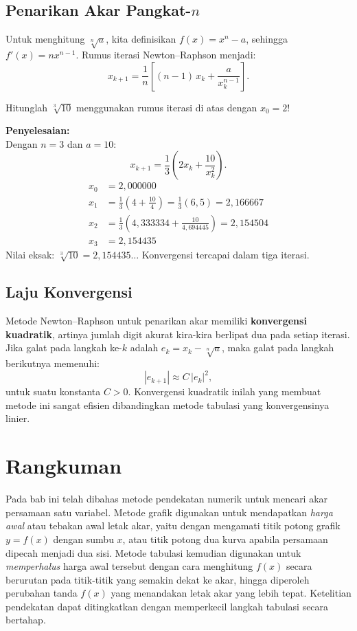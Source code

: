 \subsection{Penarikan Akar Pangkat-$n$}

Untuk menghitung $\sqrt[n]{a}$, kita definisikan $f(x) = x^n - a$, sehingga $f'(x) = nx^{n-1}$. Rumus iterasi Newton--Raphson menjadi:
\begin{equation}
x_{k+1} = \frac{1}{n}\left[(n-1)\,x_k + \frac{a}{x_k^{n-1}}\right].
\end{equation}

\begin{exmp}
Hitunglah $\sqrt[3]{10}$ menggunakan rumus iterasi di atas dengan $x_0 = 2$!

\textbf{Penyelesaian:}\\
Dengan $n = 3$ dan $a = 10$:
\[
x_{k+1} = \frac{1}{3}\left(2x_k + \frac{10}{x_k^2}\right).
\]
\begin{align*}
x_0 &= 2{,}000000 \\
x_1 &= \frac{1}{3}\left(4 + \frac{10}{4}\right) = \frac{1}{3}(6{,}5) = 2{,}166667 \\
x_2 &= \frac{1}{3}\left(4{,}333334 + \frac{10}{4{,}694445}\right) = 2{,}154504 \\
x_3 &= 2{,}154435
\end{align*}
Nilai eksak: $\sqrt[3]{10} = 2{,}154435\ldots$ Konvergensi tercapai dalam tiga iterasi.
\end{exmp}

\subsection{Laju Konvergensi}

Metode Newton--Raphson untuk penarikan akar memiliki \textbf{konvergensi kuadratik}, artinya jumlah digit akurat kira-kira berlipat dua pada setiap iterasi. Jika galat pada langkah ke-$k$ adalah $e_k = x_k - \sqrt[n]{a}$, maka galat pada langkah berikutnya memenuhi:
\[
|e_{k+1}| \approx C\,|e_k|^2,
\]
untuk suatu konstanta $C > 0$. Konvergensi kuadratik inilah yang membuat metode ini sangat efisien dibandingkan metode tabulasi yang konvergensinya linier.


\section*{Rangkuman}

Pada bab ini telah dibahas metode pendekatan numerik untuk mencari akar persamaan satu variabel. Metode grafik digunakan untuk mendapatkan \textit{harga awal} atau tebakan awal letak akar, yaitu dengan mengamati titik potong grafik $y = f(x)$ dengan sumbu $x$, atau titik potong dua kurva apabila persamaan dipecah menjadi dua sisi. Metode tabulasi kemudian digunakan untuk \textit{memperhalus} harga awal tersebut dengan cara menghitung $f(x)$ secara berurutan pada titik-titik yang semakin dekat ke akar, hingga diperoleh perubahan tanda $f(x)$ yang menandakan letak akar yang lebih tepat. Ketelitian pendekatan dapat ditingkatkan dengan memperkecil langkah tabulasi secara bertahap.


